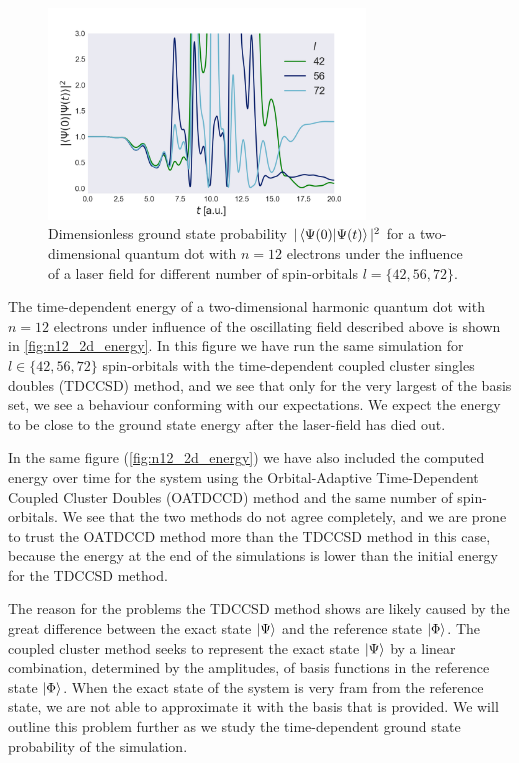 \begin{figure}
    \centering
    \includegraphics[width=0.75\textwidth]{results/figures/2D/n12_overlap.png} 
    \caption{Dimensionless ground state probability $|\braket{\Psi(0)}{\Psi(t)}|^2$ for a two-dimensional
        quantum dot with $n=12$ electrons under the influence of a laser field for 
        different number of spin-orbitals $l=\{42,56,72\}$. 
    }
    \label{fig:n12_2d_overlap}
\end{figure}

The time-dependent energy of a two-dimensional harmonic quantum dot with $n=12$
electrons under influence of the oscillating field described above is shown in 
\autoref{fig:n12_2d_energy}. In this figure we have run the same simulation for 
$l\in\{42,56,72\}$ spin-orbitals with the time-dependent coupled cluster 
singles doubles (TDCCSD) method, and we see that only for the very largest of the 
basis set, we see a behaviour conforming with our expectations. We expect the 
energy to be close to the ground state energy after the laser-field has died out.

In the same figure (\autoref{fig:n12_2d_energy}) we have also included
the computed energy over time for the system using the
Orbital-Adaptive Time-Dependent Coupled Cluster Doubles (OATDCCD) method and the 
same number of spin-orbitals.
We see that the two methods do not agree completely, and we are prone to trust 
the OATDCCD method more than the TDCCSD method in this case, because the energy at 
the end of the simulations is lower than the initial energy for the TDCCSD method.

The reason for the problems the TDCCSD method shows are likely caused by the 
great difference between the exact state $\ket{\Psi}$ and the reference state 
$\ket{\Phi}$. The coupled cluster method seeks to represent the exact state 
$\ket{\Psi}$ by a linear combination, determined by the amplitudes, of basis functions 
in the reference state $\ket{\Phi}$. When the exact state of the system is very 
fram from the reference state, we are not able to approximate it with the basis that 
is provided. We will outline this problem further as we study the time-dependent 
ground state probability of the simulation.

